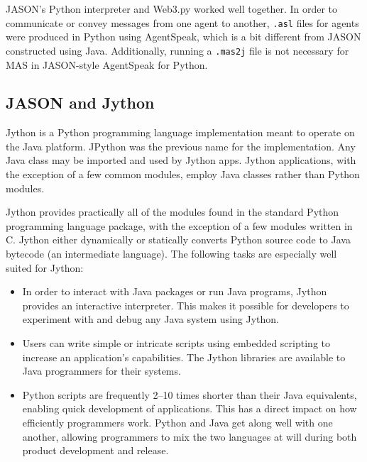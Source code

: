 \vspace{.5cm}

JASON's Python interpreter and Web3.py worked well together. In order to communicate or convey messages from one agent to another, \texttt{.asl} files for agents were produced in Python using AgentSpeak, which is a bit different from JASON constructed using Java. Additionally, running a \texttt{.mas2j} file is not necessary for \ac{MAS} in JASON-style AgentSpeak for Python.

\subsection{JASON and Jython}


Jython is a Python programming language implementation meant to operate on the Java platform. JPython was the previous name for the implementation. Any Java class may be imported and used by Jython apps. Jython applications, with the exception of a few common modules, employ Java classes rather than Python modules. 

\vspace{.5cm}
Jython provides practically all of the modules found in the standard Python programming language package, with the exception of a few modules written in C. Jython either dynamically or statically converts Python source code to Java bytecode (an intermediate language). The following tasks are especially well suited for Jython:

\begin{itemize}
    \item In order to interact with Java packages or run Java programs, Jython provides an interactive interpreter. This makes it possible for developers to experiment with and debug any Java system using Jython.
    \vspace{.5cm}
    \item Users can write simple or intricate scripts using embedded scripting to increase an application's capabilities. The Jython libraries are available to Java programmers for their systems.
    \vspace{.5cm}
     \item Python scripts are frequently 2–10 times shorter than their Java equivalents, enabling quick development of applications. This has a direct impact on how efficiently programmers work. Python and Java get along well with one another, allowing programmers to mix the two languages at will during both product development and release.
\end{itemize}

